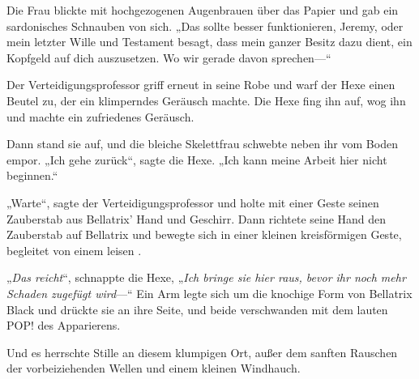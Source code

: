 Die Frau blickte mit hochgezogenen Augenbrauen über das Papier und gab ein sardonisches Schnauben von sich. „Das sollte besser funktionieren, Jeremy, oder mein letzter Wille und Testament besagt, dass mein ganzer Besitz dazu dient, ein Kopfgeld auf dich auszusetzen. Wo wir gerade davon sprechen—“

Der Verteidigungsprofessor griff erneut in seine Robe und warf der Hexe einen Beutel zu, der ein klimperndes Geräusch machte. Die Hexe fing ihn auf, wog ihn und machte ein zufriedenes Geräusch.

Dann stand sie auf, und die bleiche Skelettfrau schwebte neben ihr vom Boden empor. „Ich gehe zurück“, sagte die Hexe. „Ich kann meine Arbeit hier nicht beginnen.“

„Warte“, sagte der Verteidigungsprofessor und holte mit einer Geste seinen Zauberstab aus Bellatrix’ Hand und Geschirr. Dann richtete seine Hand den Zauberstab auf Bellatrix und bewegte sich in einer kleinen kreisförmigen Geste, begleitet von einem leisen .

„\emph{Das reicht}“, schnappte die Hexe, „\emph{Ich bringe sie hier raus, bevor ihr noch mehr Schaden zugefügt wird}—“ Ein Arm legte sich um die knochige Form von Bellatrix Black und drückte sie an ihre Seite, und beide verschwanden mit dem lauten POP! des Apparierens.

Und es herrschte Stille an diesem klumpigen Ort, außer dem sanften Rauschen der vorbeiziehenden Wellen und einem kleinen Windhauch.

